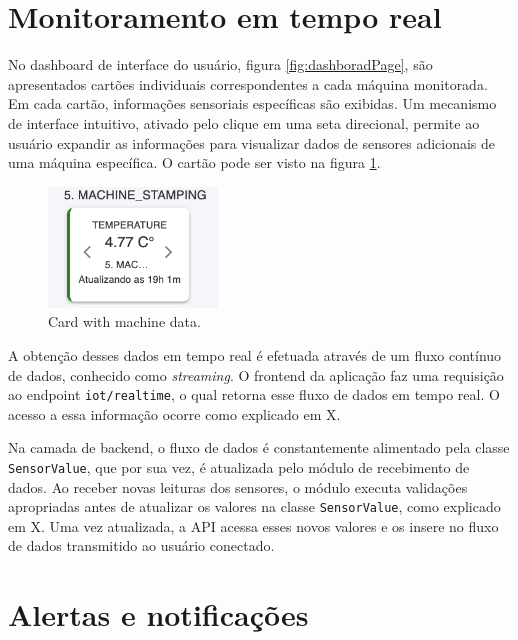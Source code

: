 \section[Monitoramento em tempo real]{Monitoramento em tempo real}\label{sec:realtimeMonitoring}

No dashboard de interface do usuário, figura \ref{fig:dashboradPage}, são apresentados cartões individuais correspondentes a cada máquina monitorada. Em cada cartão, informações sensoriais específicas são exibidas. Um mecanismo de interface intuitivo, ativado pelo clique em uma seta direcional, permite ao usuário expandir as informações para visualizar dados de sensores adicionais de uma máquina específica. O cartão pode ser visto na figura \ref{fig:cardData}.

\begin{figure}[htbp]
	\centering
	\includegraphics[width=0.4\textwidth]{images/machineCard.png}
	\caption{Card with machine data.}
	\label{fig:cardData}
\end{figure}

A obtenção desses dados em tempo real é efetuada através de um fluxo contínuo de dados, conhecido como \textit{streaming}. O frontend da aplicação faz uma requisição ao endpoint \texttt{iot/realtime}, o qual retorna esse fluxo de dados em tempo real. O acesso a essa informação ocorre como explicado em X. 

Na camada de backend, o fluxo de dados é constantemente alimentado pela classe \texttt{SensorValue}, que por sua vez, é atualizada pelo módulo de recebimento de dados. Ao receber novas leituras dos sensores, o módulo executa validações apropriadas antes de atualizar os valores na classe \texttt{SensorValue}, como explicado em X. Uma vez atualizada, a API acessa esses novos valores e os insere no fluxo de dados transmitido ao usuário conectado.


\section[Alertas e notificações]{Alertas e notificações}\label{sec:alertsAndNotifications}


